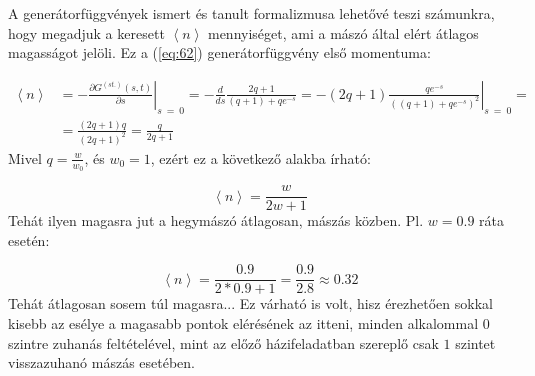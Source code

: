 A generátorfüggvények ismert és tanult formalizmusa lehetővé teszi számunkra, hogy megadjuk a keresett $\left< n \right>$ mennyiséget, ami a mászó által elért átlagos magasságot jelöli. Ez a (\ref{eq:62}) generátorfüggvény első momentuma:

\begin{align}
    \left< n \right>
    &=
    - \left. \frac{\partial G^{\left( st. \right)} \left( s,t \right)}{\partial s} \right\rvert_{s\ =\ 0}
    =
    - \frac{d}{d s} \frac{2q + 1}{\left( q + 1 \right) + q e^{-s}}
    =
    - \left. \left( 2q + 1 \right) \frac{q e^{-s}}{\left( \left( q + 1 \right) + q e^{-s} \right)^{2}} \right\rvert_{s\ =\ 0}
    = \nonumber \\
    &=
    \frac{\left( 2q + 1 \right) q}{\left( 2q + 1 \right)^{2}}
    =
    \frac{q}{2q + 1}
\end{align}
Mivel $q = \frac{w}{w_{0}}$, és $w_{0} = 1$, ezért ez a következő alakba írható:

\begin{equation}
    \boxed{
    \left< n \right>
    =
    \frac{w}{2w + 1}
    }
\end{equation}
Tehát ilyen magasra jut a hegymászó átlagosan, mászás közben. Pl. $w = 0.9$ ráta esetén:

\begin{equation}
    \left< n \right>
    =
    \frac{0.9}{2 * 0.9 + 1}
    =
    \frac{0.9}{2.8}
    \approx
    0.32
\end{equation}
Tehát átlagosan sosem túl magasra... Ez várható is volt, hisz érezhetően sokkal kisebb az esélye a magasabb pontok elérésének az itteni, minden alkalommal $0$ szintre zuhanás feltételével, mint az előző házifeladatban szereplő csak $1$ szintet visszazuhanó mászás esetében.